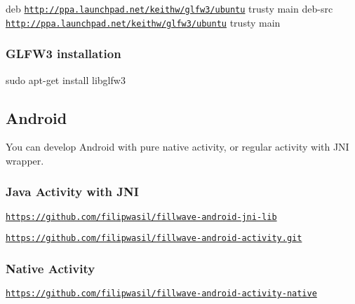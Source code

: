  
\begin{DoxyPre}
{\ttfamily 
deb \href{http://ppa.launchpad.net/keithw/glfw3/ubuntu}{\tt http://ppa.launchpad.net/keithw/glfw3/ubuntu} trusty main
deb-src \href{http://ppa.launchpad.net/keithw/glfw3/ubuntu}{\tt http://ppa.launchpad.net/keithw/glfw3/ubuntu} trusty main
}
\end{DoxyPre}
 \subsubsection*{{\bfseries G\+L\+F\+W3 installation}}

  
\begin{DoxyPre}
{\ttfamily 
sudo apt-get install libglfw3
}
\end{DoxyPre}




\subsection*{{\bfseries Android}}

 

 You can develop Android with pure native activity, or regular activity with J\+N\+I wrapper.



\subsubsection*{{\bfseries Java Activity with J\+N\+I}}




\begin{DoxyItemize}
\item \href{https://github.com/filipwasil/fillwave-android-jni-lib}{\tt https\+://github.\+com/filipwasil/fillwave-\/android-\/jni-\/lib}
\item \href{https://github.com/filipwasil/fillwave-android-activity.git}{\tt https\+://github.\+com/filipwasil/fillwave-\/android-\/activity.\+git}
\end{DoxyItemize}

\subsubsection*{{\bfseries Native Activity}}




\begin{DoxyItemize}
\item \href{https://github.com/filipwasil/fillwave-android-activity-native}{\tt https\+://github.\+com/filipwasil/fillwave-\/android-\/activity-\/native}
\end{DoxyItemize}

